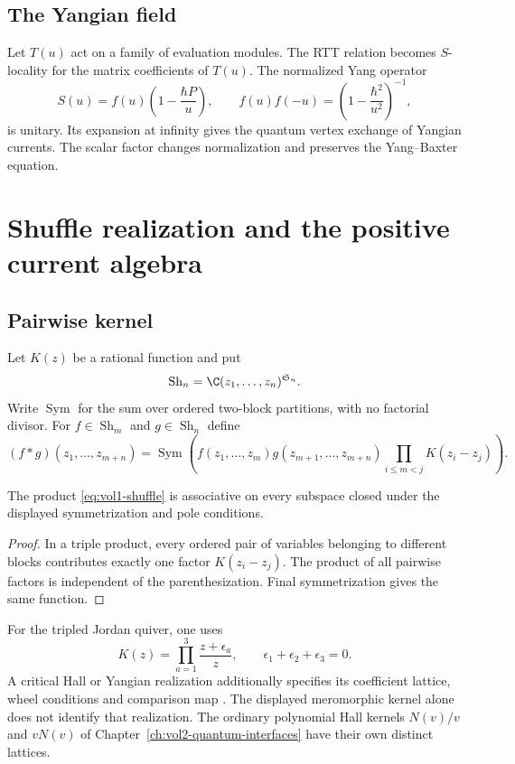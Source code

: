 \section{The Yangian field}
Let $T(u)$ act on a family of evaluation modules.  The RTT relation becomes $S$-locality for the matrix coefficients of $T(u)$.  The normalized Yang operator
\[
 S(u)=f(u)\left(1-\frac{\hbar P}{u}\right),
 \qquad
 f(u)f(-u)=\left(1-\frac{\hbar^2}{u^2}\right)^{-1},
\]
is unitary.  Its expansion at infinity gives the quantum vertex exchange of Yangian currents.  The scalar factor changes normalization and preserves the Yang--Baxter equation.

\chapter{Shuffle realization and the positive current algebra}
\section{Pairwise kernel}
Let $K(z)$ be a rational function and put
\[
 \operatorname{Sh}_n=\C(z_1,\ldots,z_n)^{\mathfrak S_n}.
\]
Write $\operatorname{Sym}$ for the sum over ordered two-block
partitions, with no factorial divisor.
For $f\in\operatorname{Sh}_m$ and $g\in\operatorname{Sh}_n$ define
\begin{equation}\label{eq:vol1-shuffle}
 (f*g)(z_1,\ldots,z_{m+n})
 =\operatorname{Sym}
 \left(
 f(z_1,\ldots,z_m)g(z_{m+1},\ldots,z_{m+n})
 \prod_{i\le m<j}K(z_i-z_j)
 \right).
\end{equation}

\begin{theorem}
The product \eqref{eq:vol1-shuffle} is associative on every subspace closed under the displayed symmetrization and pole conditions.
\end{theorem}
\begin{proof}
In a triple product, every ordered pair of variables belonging to different blocks contributes exactly one factor $K(z_i-z_j)$.  The product of all pairwise factors is independent of the parenthesization.  Final symmetrization gives the same function.
\end{proof}

For the tripled Jordan quiver, one uses
\[
 K(z)=\prod_{a=1}^3\frac{z+\epsilon_a}{z},
 \qquad \epsilon_1+\epsilon_2+\epsilon_3=0.
\]
A critical Hall or Yangian realization additionally specifies its
coefficient lattice, wheel conditions and comparison map
\cite{SVYangians,Tsymbaliuk}.
The displayed meromorphic kernel alone does not identify that realization.
The ordinary polynomial Hall kernels $N(v)/v$ and $vN(v)$ of
Chapter~\ref{ch:vol2-quantum-interfaces} have their own distinct lattices.

